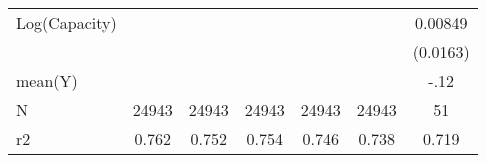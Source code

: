 {\begin{tabular}{l*{6}{c}}
Log(Capacity)   &            &            &            &            &            &  0.00849   \\
                &            &            &            &            &            & (0.0163)   \\
\midrule
mean(Y)         &            &            &            &            &            &     -.12   \\
N               &    24943   &    24943   &    24943   &    24943   &    24943   &       51   \\
r2              &    0.762   &    0.752   &    0.754   &    0.746   &    0.738   &    0.719   \\
\bottomrule
\end{tabular}
}
